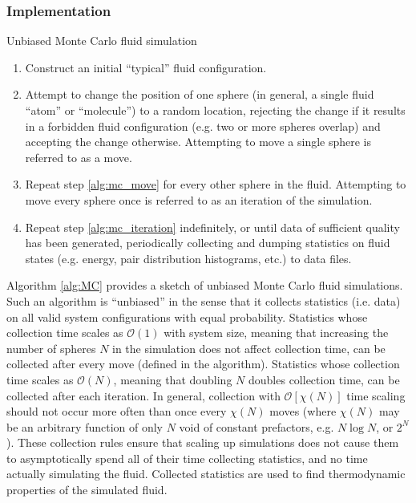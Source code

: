 \documentclass[11pt]{article}
\newcommand{\p}[1]{\left(#1\right)} %
\renewcommand{\sp}[1]{\left[#1\right]} %
\newenvironment{alg}
{\hrulefill\begin{enumerate}}
{\end{enumerate}\hrulefill}
\begin{document}
\subsubsection{Implementation}
\label{sec:mc_implementation}

\begin{algorithm}[tb]
  \caption{Unbiased Monte Carlo fluid simulation}
  \label{alg:MC}
  \begin{alg}

  \item Construct an initial ``typical'' fluid configuration.

  \item Attempt to change the position of one sphere (in general, a
    single fluid ``atom'' or ``molecule'') to a random location,
    rejecting the change if it results in a forbidden fluid
    configuration (e.g. two or more spheres overlap) and accepting the
    change otherwise. Attempting to move a single sphere is referred
    to as a move. \label{alg:mc_move}

  \item Repeat step \ref{alg:mc_move} for every other sphere in the
    fluid. Attempting to move every sphere once is referred to as an
    iteration of the simulation.
    \label{alg:mc_iteration}

  \item Repeat step \ref{alg:mc_iteration} indefinitely, or until data
    of sufficient quality has been generated, periodically collecting
    and dumping statistics on fluid states (e.g. energy, pair
    distribution histograms, etc.) to data files.

  \end{alg}
\end{algorithm}

Algorithm \ref{alg:MC} provides a sketch of unbiased Monte Carlo fluid
simulations. Such an algorithm is ``unbiased'' in the sense that it
collects statistics (i.e. data) on all valid system configurations
with equal probability. Statistics whose collection time scales as
$\mathcal O\p{1}$ with system size, meaning that increasing the number
of spheres $N$ in the simulation does not affect collection time, can
be collected after every move (defined in the algorithm). Statistics
whose collection time scales as $\mathcal O\p{N}$, meaning that
doubling $N$ doubles collection time, can be collected after each
iteration. In general, collection with $\mathcal O\sp{\chi\p{N}}$ time
scaling should not occur more often than once every $\chi\p{N}$ moves
(where $\chi\p{N}$ may be an arbitrary function of only $N$ void of
constant prefactors, e.g. $N\log N$, or $2^N$). These collection rules
ensure that scaling up simulations does not cause them to
asymptotically spend all of their time collecting statistics, and no
time actually simulating the fluid. Collected statistics are used to
find thermodynamic properties of the simulated fluid.
\end{document}
